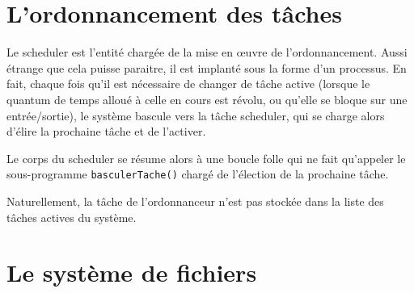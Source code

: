 \documentclass{book}
\begin{document}

\section{L'ordonnancement des tâches}

   Le scheduler est l'entité chargée de la mise en \oe{}uvre de
l'ordonnancement. Aussi étrange que cela puisse paraitre, il est
implanté sous la forme d'un processus. En fait, chaque fois qu'il est
nécessaire de changer de tâche active (lorsque le quantum de temps
alloué à celle en cours est révolu, ou qu'elle se bloque sur une
entrée/sortie), le système bascule vers la tâche scheduler, qui se
charge alors d'élire la prochaine tâche et de l'activer.

   Le corps du scheduler se résume alors à une boucle folle qui ne
fait qu'appeler le sous-programme {\tt basculerTache()} chargé de
l'élection de la prochaine tâche.

   Naturellement, la tâche de l'ordonnanceur n'est pas stockée dans la
liste des tâches actives du système.

\section{Le système de fichiers}


%
\appendix


\printindex
\end{document}
